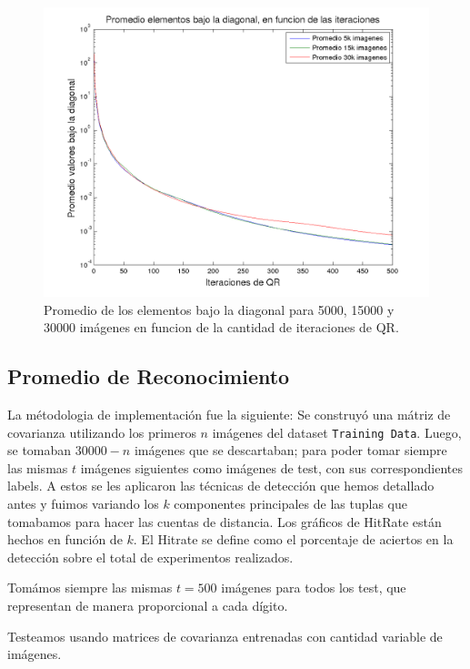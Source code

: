 \begin{figure}[H]
\begin {center}
\includegraphics[width=\hrwidth]{plots/PROM.png}
\end {center}
\caption{Promedio de los elementos bajo la diagonal para 5000, 15000 y 30000 im\'agenes
en funcion de la cantidad de iteraciones de QR.}
\label{fig:PROM}
\end{figure}


\subsection{Promedio de Reconocimiento}
La m\'etodologia de implementaci\'on fue la siguiente: Se construy\'o una
m\'atriz de covarianza utilizando los primeros $n$ im\'agenes del dataset
\texttt{Training Data}. Luego, se tomaban $30000-n$ im\'agenes que se descartaban; para poder tomar 
siempre las mismas $t$ im\'agenes siguientes como im\'agenes de test, con sus 
correspondientes labels. A estos se les aplicaron las t\'ecnicas
de detecci\'on que hemos detallado antes y fuimos variando los $k$ componentes principales 
de las tuplas que tomabamos para hacer las cuentas de distancia.
Los gr\'aficos de HitRate est\'an hechos en funci\'on de $k$.
El Hitrate se define como el porcentaje de aciertos en la detecci\'on sobre el total de 
experimentos realizados.

Tom\'amos siempre las mismas $t=500$ im\'agenes para todos los test, que representan
de manera proporcional a cada d\'igito.

Testeamos usando matrices de covarianza entrenadas con cantidad variable de im\'agenes.
\def \hrwidth {500pt}

